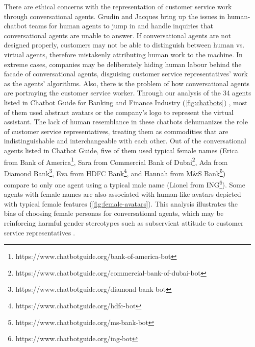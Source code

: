 \documentclass{sigchi-ext}
\begin{document}
There are ethical concerns with the representation of customer service work through conversational agents. Grudin and Jacques \cite{grudin2019chatbots} bring up the issues in human-chatbot teams for human agents to jump in and handle inquiries that conversational agents are unable to answer. If conversational agents are not designed properly, customers may not be able to distinguish between human vs. virtual agents, therefore mistakenly attributing human work to the machine. In extreme cases, companies may be deliberately hiding human labour behind the facade of conversational agents, disguising customer service representatives' work as the agents' algorithms. Also, there is the problem of how conversational agents are portraying the customer service worker. Through our analysis of the 34 agents listed in Chatbot Guide for Banking and Finance Industry \cite{chatbotguide} (\autoref{fig:chatbots}) , most of them used abstract avatars or the company's logo to represent the virtual assistant. The lack of human resemblance in these chatbots dehumanizes the role of customer service representatives, treating them as commodities that are indistinguishable and interchangeable with each other. Out of the conversational agents listed in Chatbot Guide, five of them used typical female names (Erica from Bank of America\footnote{https://www.chatbotguide.org/bank-of-america-bot}, Sara from Commercial Bank of Dubai\footnote{https://www.chatbotguide.org/commercial-bank-of-dubai-bot}, Ada from Diamond Bank\footnote{https://www.chatbotguide.org/diamond-bank-bot}, Eva from HDFC Bank\footnote{https://www.chatbotguide.org/hdfc-bot}, and Hannah from M\&S Bank\footnote{https://www.chatbotguide.org/ms-bank-bot}) compare to only one agent using a typical male name (Lionel from ING\footnote{https://www.chatbotguide.org/ing-bot}). Some agents with female names are also associated with human-like avatars depicted with typical female features (\autoref{fig:female-avatars}). This analysis illustrates the bias of choosing female personas for conversational agents, which may be reinforcing harmful gender stereotypes such as subservient attitude to customer service representatives \cite{ruane2019conversational}.
\end{document}
